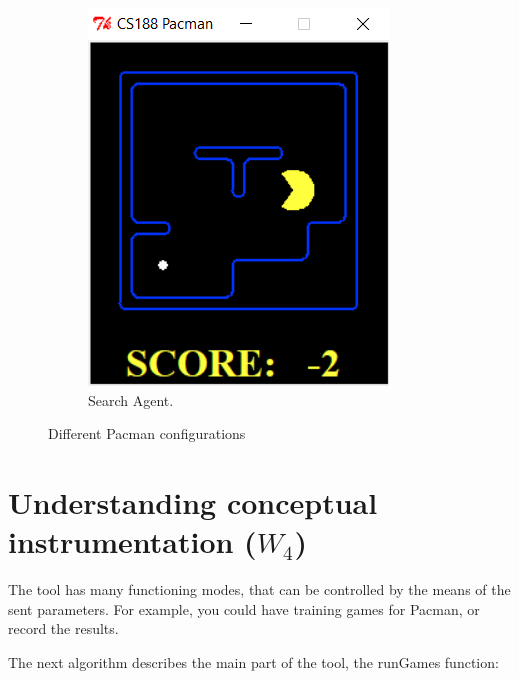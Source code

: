 \documentclass[a4paper,12pt]{report}
\begin{document}
\begin{figure}[h!]
\begin{subfigure}[b]{0.3\linewidth}
    \includegraphics[width=\linewidth]{pictures/pacman3.png}
    \caption{Search Agent.}
  \end{subfigure}
  \caption{Different Pacman configurations}
  \label{fig:pic1}
\end{figure}

\vspace{0.5cm}

 
\chapter{Understanding conceptual instrumentation ($W_4$)}

The tool has many functioning modes, that can be controlled by the means of the sent parameters. For example, you could have training games for Pacman, or record the results.

The next algorithm describes the main part of the tool, the runGames function:
\end{document}
